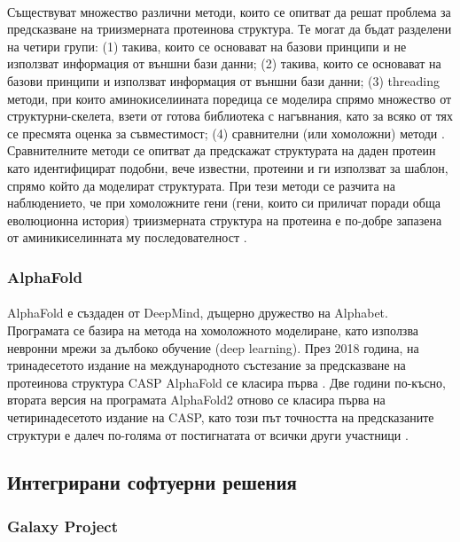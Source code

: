 \documentclass[pdftex,cyrillic,14pt,a4page,twoside,openright]{extreport}
\begin{document}
\paragraph{}
Съществуват множество различни методи, които се опитват да решат проблема за предсказване на триизмерната протеинова структура. Те могат да бъдат разделени на четири групи: (1) такива, които се основават на базови принципи и не използват информация от външни бази данни; (2) такива, които се основават на базови принципи и използват информация от външни бази данни; (3) threading методи, при които аминокиселиината поредица се моделира спрямо множество от структурни-скелета, взети от готова библиотека с нагъвнания, като за всяко от тях се пресмята оценка за съвместимост; (4) сравнителни (или хомоложни) методи \cite{dorn2014}. Сравнителните методи се опитват да предскажат структурата на даден протеин като идентифицират подобни, вече известни, протеини и ги използват за шаблон, спрямо който да моделират структурата. При тези методи се разчита на наблюдението, че при хомоложните гени (гени, които си приличат поради обща еволюционна история) триизмерната структура на протеина е по-добре запазена от аминикиселинната му последователност \cite{illergard2009}.


\subsubsection{AlphaFold}
\paragraph{}
AlphaFold е създаден от DeepMind, дъщерно дружество на Alphabet. Програмата се базира на метода на хомоложното моделиране, като използва невронни мрежи за дълбоко обучение (deep learning). През 2018 година, на тринадесетото издание на международното състезание за предсказване на протеинова структура CASP AlphaFold се класира първа \cite{alquraishi2019}. Две години по-късно, втората версия на програмата AlphaFold2 отново се класира първа на четиринадесетото издание на CASP, като този път точността на предсказаните структури е далеч по-голяма от постигнатата от всички други участници \cite{alphafold2021}.

\subsection{Интегрирани софтуерни решения}
\subsubsection{Galaxy Project}
\end{document}
